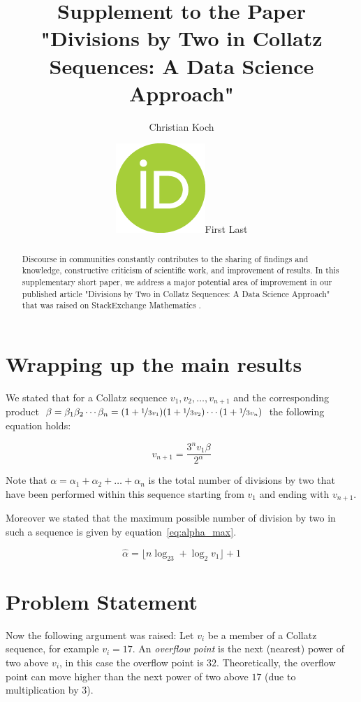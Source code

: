 \documentclass[12pt]{amsart}
\title[Supplement to the Paper Divisions by Two]{Supplement to the Paper "Divisions by Two in Collatz Sequences: A Data Science Approach"}
\author[C.\ Koch]{Christian Koch}
\author[F.\ Last1]{\href{https://orcid.org/0000-0000-0000-0000}{\includegraphics[scale=0.06]{orcid.png}}\hspace{1mm}First Last}
\theoremstyle{definition}
\begin{document}
	
\begingroup
\let\MakeUppercase\relax
\maketitle
\endgroup

\begin{abstract}
Discourse in communities constantly contributes to the sharing of findings and knowledge, constructive criticism of scientific work, and improvement of results. In this supplementary short paper, we address a major potential area of improvement in our published article "Divisions by Two in Collatz Sequences: A Data Science Approach" \cite{Koch_2020} that was raised on StackExchange Mathematics \cite{Collag3n_2020}.
\end{abstract}

\newpage
\section{Wrapping up the main results}
\label{wrap_up}
We stated that for a Collatz sequence $v_1,v_2,\ldots,v_{n+1}$ and the corresponding product $\beta=\beta_1\beta_2\cdots\beta_n=(1+\nicefrac{1}{3v_1})(1+\nicefrac{1}{3v_2})\cdots(1+\nicefrac{1}{3v_n})$ the following equation holds:

\begin{equation}
\label{eq:vn_plus_1}
v_{n+1}=\frac{3^nv_1\beta}{2^{\alpha}}
\end{equation}

Note that $\alpha=\alpha_1+\alpha_2+\ldots+\alpha_n$ is the total number of divisions by two that have been performed within this sequence starting from $v_1$ and ending with $v_{n+1}$.

Moreover we stated that the maximum possible number of division by two in such a sequence is given by equation~\ref{eq:alpha_max}.

\begin{equation}
\label{eq:alpha_max}
\hat\alpha=\lfloor n\log_23+\log_2v_1\rfloor+1
\end{equation}

\section{Problem Statement}
\label{problem_statement}

Now the following argument was raised: Let $v_i$ be a member of a Collatz sequence, for example $v_i=17$. An \textit{overflow point} is the next (nearest) power of two above $v_i$, in this case the overflow point is $32$. Theoretically, the overflow point can move higher than the next power of two above $17$ (due to multiplication by $3$).
\end{document}
